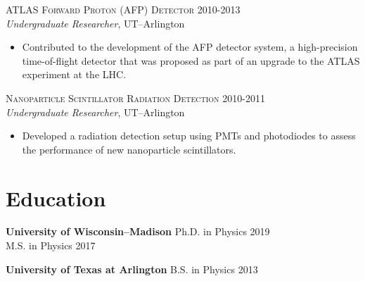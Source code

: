 \documentclass[line,margin]{res}
\begin{document}
\begin{resume}
	\textsc{ATLAS Forward Proton  (AFP) Detector} \hfill 2010-2013 \\
	{\it Undergraduate Researcher}, UT--Arlington
		\begin{itemize}
		\item Contributed to the development of the AFP detector system, a high-precision time-of-flight detector that was proposed as part of an upgrade to the ATLAS experiment at the LHC.
		\end{itemize}

	\textsc{Nanoparticle Scintillator Radiation Detection} \hfill 2010-2011 \\
	{\it Undergraduate Researcher}, UT--Arlington
		\begin{itemize}
		\item Developed a radiation detection setup using PMTs and photodiodes to assess the performance of new nanoparticle scintillators.
		\end{itemize}
\fi


\section{\sc Education}
\textbf{University of Wisconsin--Madison}
\newline
Ph.D. in Physics \hfill 2019 \\
M.S. in Physics \hfill 2017

\textbf{University of Texas at Arlington}
\newline
B.S. in Physics \hfill 2013 \\



\end{resume}
\end{document}

